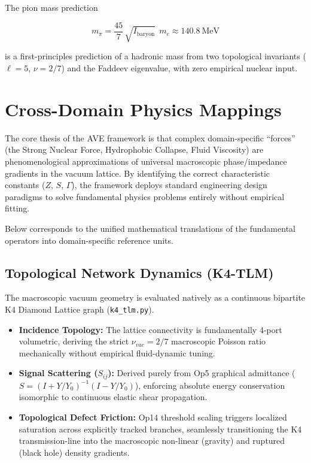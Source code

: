 \noindent The pion mass prediction

\begin{equation}
    \boxed{m_\pi = \frac{45}{7}\,\sqrt{I_\mathrm{baryon}}\;\,m_e \approx 140.8~\mathrm{MeV}}
\end{equation}

\noindent is a first-principles prediction of a hadronic mass from two topological invariants ($\ell = 5$, $\nu = 2/7$) and the Faddeev eigenvalue, with zero empirical nuclear input.

\section{Cross-Domain Physics Mappings}
\label{sec:cross_domain_mappings}

The core thesis of the AVE framework is that complex domain-specific ``forces'' (the Strong Nuclear Force, Hydrophobic Collapse, Fluid Viscosity) are phenomenological approximations of universal macroscopic phase/impedance gradients in the vacuum lattice. By identifying the correct characteristic constants ($Z$, $S$, $\Gamma$), the framework deploys standard engineering design paradigms to solve fundamental physics problems entirely without empirical fitting.

Below corresponds to the unified mathematical translations of the fundamental operators into domain-specific reference units.

\subsection{Topological Network Dynamics (K4-TLM)}
\label{sec:ee_fluids}
The macroscopic vacuum geometry is evaluated natively as a continuous bipartite K4 Diamond Lattice graph (\texttt{k4\_tlm.py}).
\begin{itemize}
    \item \textbf{Incidence Topology:} The lattice connectivity is fundamentally 4-port volumetric, deriving the strict $\nu_{vac} = 2/7$ macroscopic Poisson ratio mechanically without empirical fluid-dynamic tuning.
    \item \textbf{Signal Scattering ($S_{ij}$):} Derived purely from Op5 graphical admittance ($S = (I + Y/Y_0)^{-1}(I - Y/Y_0)$), enforcing absolute energy conservation isomorphic to continuous elastic shear propagation.
    \item \textbf{Topological Defect Friction:} Op14 threshold scaling triggers localized saturation across explicitly tracked branches, seamlessly transitioning the K4 transmission-line into the macroscopic non-linear (gravity) and ruptured (black hole) density gradients.
\end{itemize}

